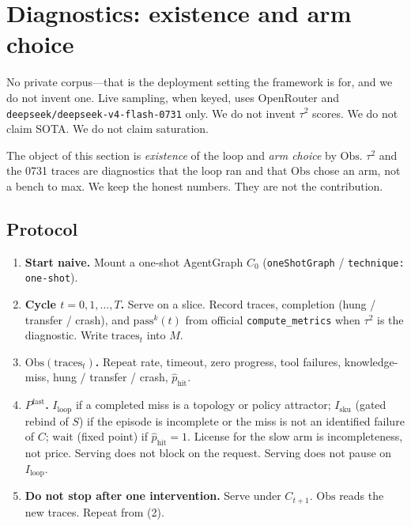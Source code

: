 \documentclass{article}
\begin{document}
\section{Diagnostics: existence and arm choice}
\label{sec:result}

No private corpus---that is the deployment setting the framework is for, and we do not invent one. Live sampling, when keyed, uses OpenRouter and \texttt{deepseek/deepseek-v4-flash-0731} only. We do not invent \(\tau^2\) scores. We do not claim SOTA. We do not claim saturation.

The object of this section is \emph{existence} of the loop and \emph{arm choice} by \(\mathrm{Obs}\). \(\tau^2\) and the 0731 traces are diagnostics that the loop ran and that \(\mathrm{Obs}\) chose an arm, not a bench to max. We keep the honest numbers. They are not the contribution.

\subsection{Protocol}
\label{sec:protocol}

\begin{enumerate}
\item \textbf{Start naive.} Mount a one-shot AgentGraph \(C_0\) (\texttt{oneShotGraph} / \texttt{technique: one-shot}).
\item \textbf{Cycle \(t=0,1,\ldots,T\).} Serve on a slice. Record traces, completion (hung / transfer / crash), and \(\mathrm{pass}^k(t)\) from official \texttt{compute\_metrics} when \(\tau^2\) is the diagnostic. Write \(\mathrm{traces}_t\) into \(M\).
\item \textbf{\(\mathrm{Obs}(\mathrm{traces}_t)\).} Repeat rate, timeout, zero progress, tool failures, knowledge-miss, hung / transfer / crash, \(\hat p_{\mathrm{hit}}\).
\item \textbf{\(P^{\mathrm{fast}}\).} \(I_{\mathrm{loop}}\) if a completed miss is a topology or policy attractor; \(I_{\mathrm{sku}}\) (gated rebind of \(S\)) if the episode is incomplete or the miss is not an identified failure of \(C\); \(\mathrm{wait}\) (fixed point) if \(\hat p_{\mathrm{hit}}=1\). License for the slow arm is incompleteness, not price. Serving does not block on the request. Serving does not pause on \(I_{\mathrm{loop}}\).
\item \textbf{Do not stop after one intervention.} Serve under \(C_{t+1}\). \(\mathrm{Obs}\) reads the new traces. Repeat from (2).
\end{enumerate}
\end{document}
